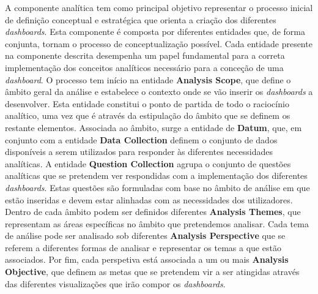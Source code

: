 A componente analítica tem como principal objetivo representar o processo inicial de definição conceptual e estratégica que orienta a criação dos diferentes \textit{dashboards}. Esta componente é composta por diferentes entidades que, de forma conjunta, tornam o processo de conceptualização possível. Cada entidade presente na componente descrita desempenha um papel fundamental para a correta implementação dos conceitos analíticos necessário para a conceção de uma \textit{dashboard}. O processo tem início na entidade \textbf{Analysis Scope}, que define o âmbito geral da análise e estabelece o contexto onde se vão inserir os \textit{dashboards} a desenvolver. Esta entidade constitui o ponto de partida de todo o raciocínio analítico, uma vez que é através da estipulação do âmbito que se definem os restante elementos. Associada ao âmbito, surge a entidade de \textbf{Datum}, que, em conjunto com a entidade \textbf{Data Collection} definem o conjunto de dados disponíveis a serem utilizados para responder às diferentes necessidades analíticas. A entidade \textbf{Question Collection} agrupa o conjunto de questões analíticas que se pretendem ver respondidas com a implementação dos diferentes \textit{dashboards}. Estas questões são formuladas com base no âmbito de análise em que estão inseridas e devem estar alinhadas com as necessidades dos utilizadores. Dentro de cada âmbito podem ser definidos diferentes \textbf{Analysis Themes}, que representam as áreas específicas no âmbito que pretendemos analisar. Cada tema de análise pode ser analisado sob diferentes \textbf{Analysis Perspective} que se referem a diferentes formas de analisar e representar os temas a que estão associados. Por fim, cada perspetiva está associada a um ou mais \textbf{Analysis Objective}, que definem as metas que se pretendem vir a ser atingidas através das diferentes visualizações que irão compor os \textit{dashboards}.

